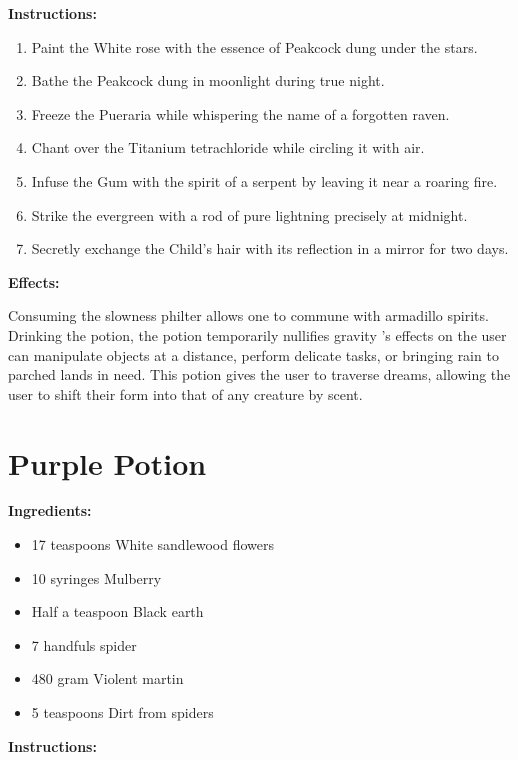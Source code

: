 \documentclass{article}
\begin{document}
\textbf{Instructions:}

\begin{enumerate}
  \item Paint the White rose with the essence of Peakcock dung under the stars.
  \item Bathe the Peakcock dung in moonlight during true night.
  \item Freeze the Pueraria while whispering the name of a forgotten raven.
  \item Chant over the Titanium tetrachloride while circling it with air.
  \item Infuse the Gum with the spirit of a serpent by leaving it near a roaring fire.
  \item Strike the evergreen with a rod of pure lightning precisely at midnight.
  \item Secretly exchange the Child's hair with its reflection in a mirror for two days.
\end{enumerate}

\textbf{Effects:}

Consuming the slowness philter allows one to commune with armadillo spirits. Drinking the potion, the potion temporarily nullifies gravity 's effects on the user can manipulate objects at a distance, perform delicate tasks, or bringing rain to parched lands in need. This potion gives the user to traverse dreams, allowing the user to shift their form into that of any creature by scent.

\newpage
\section*{Purple Potion}

\textbf{Ingredients:}

\begin{itemize}
  \item 17 teaspoons White sandlewood flowers
  \item 10 syringes Mulberry
  \item Half a teaspoon Black earth
  \item 7 handfuls spider
  \item 480 gram Violent martin
  \item 5 teaspoons Dirt from spiders
\end{itemize}

\textbf{Instructions:}
\end{document}
